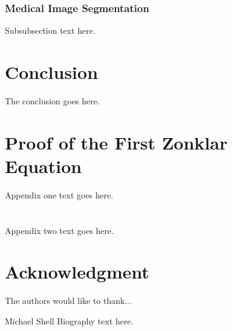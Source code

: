 \documentclass[journal]{IEEEtran}
\begin{document}
\subsubsection{Medical Image Segmentation}






Subsubsection text here.

\section{Conclusion}
The conclusion goes here.






%


\appendices
\section{Proof of the First Zonklar Equation}
Appendix one text goes here.

\section{}
Appendix two text goes here.


\section*{Acknowledgment}


The authors would like to thank...

\cite{IEEEexample:biblatex}




\begin{IEEEbiography}{Michael Shell}
Biography text here.
\end{IEEEbiography}
\end{document}

